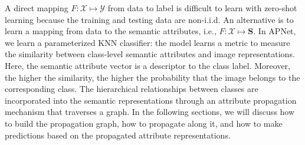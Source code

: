 \documentclass[letterpaper]{article} %
\def\vs{{\bm{s}}}
\def\vx{{\bm{x}}}
\def\mS{{\bm{S}}}
\begin{document}

A direct mapping $F:\mathcal X \mapsto \mathcal{Y}$ from data to label is difficult to learn with zero-shot learning because the training and testing data are non-i.i.d. An alternative is to learn a mapping from data to the semantic attributes, i.e., $F:\mathcal{X}\mapsto\mS$. In APNet, we learn a parameterized KNN classifier: the model learns a metric to measure the similarity between class-level semantic attributes and image representations. Here, the semantic attribute vector is a descriptor to the class label. Moreover, the higher the similarity, the higher the probability that the image belongs to the corresponding class. The hierarchical relationships between classes are incorporated into the semantic representations through an attribute propagation mechanism that traverses a graph. In the following sections, we will discuss how to build the propagation graph, how to propagate along it, and how to make predictions based on the propagated attribute representations.






\end{document}
